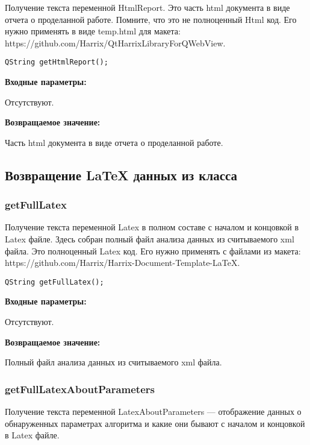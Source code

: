 \documentclass[a4paper,12pt]{article}
\begin{document}
Получение текста переменной HtmlReport. Это часть html документа в виде отчета о проделанной работе. Помните, что это не полноценный Html код. Его нужно применять в виде temp.html для макета: https://github.com/Harrix/QtHarrixLibraryForQWebView.


\begin{lstlisting}[label=code_syntax_getHtmlReport,caption=Синтаксис]
QString getHtmlReport();
\end{lstlisting}

\textbf{Входные параметры:}

Отсутствуют.

\textbf{Возвращаемое значение:}

Часть html документа в виде отчета о проделанной работе.


\subsection{Возвращение LaTeX данных из класса}

\subsubsection{getFullLatex}\label{getFullLatex}

Получение текста переменной Latex в полном составе с началом и концовкой в Latex файле. Здесь собран полный файл анализа данных из считываемого xml файла. Это полноценный Latex код. Его нужно применять с файлами из макета: https://github.com/Harrix/Harrix-Document-Template-LaTeX.


\begin{lstlisting}[label=code_syntax_getFullLatex,caption=Синтаксис]
QString getFullLatex();
\end{lstlisting}

\textbf{Входные параметры:}

Отсутствуют.

\textbf{Возвращаемое значение:}

Полный файл анализа данных из считываемого xml файла.


\subsubsection{getFullLatexAboutParameters}\label{getFullLatexAboutParameters}

Получение текста переменной LatexAboutParameters --- отображение данных о обнаруженных параметрах алгоритма и какие они бывают с началом и концовкой в Latex файле.
\end{document}
